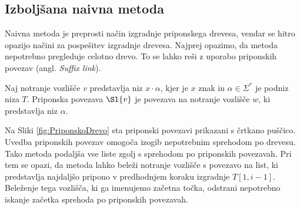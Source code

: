 \subsection{Izboljšana naivna metoda}
Naivna metoda je preprosti način izgradnje priponskega drevesa, vendar se hitro opazijo načini za pospešitev izgradnje drevesa. Najprej opazimo, da metoda nepotrebno pregleduje celotno drevo. To se lahko reši z uporabo priponskih povezav (angl. \textit{Suffix link}).

\begin{defi}\label{def:sl}
    Naj notranje vozlišče $v$ predstavlja niz $x\cdot\alpha$, kjer je $x$ znak in $\alpha\in\Sigma^*$ je podniz niza $T$. Priponska povezava $\Sl{v}$ je povezava na notranje vozlišče $w$, ki predstavlja niz $\alpha$.

\end{defi}

Na Sliki \ref{fig:PriponskoDrevo} sta priponski povezavi prikazani s črtkano puščico. Uvedba priponskih povezav omogoča izogib nepotrebnim sprehodom po drevesu. Tako metoda podaljša vse liste zgolj s sprehodom po priponskih povezavah. Pri tem se opazi, da metoda lahko beleži notranje vozlišče s povezavo na list, ki predstavlja najdaljšo pripono v predhodnjem koraku izgradnje $T[1,i-1]$. Beleženje tega vozlišča, ki ga imenujemo začetna točka, odstrani nepotrebno iskanje začetka sprehoda po priponskih povezavah.

